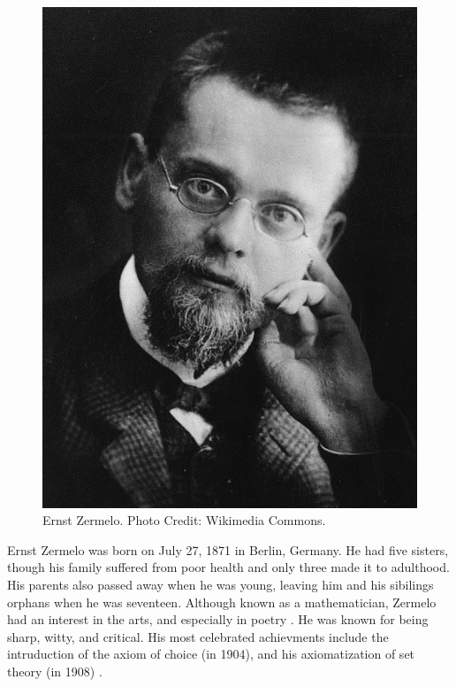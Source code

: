 \documentclass[../../../include/open-logic-section]{subfiles}
\begin{document}


\begin{figure}[h!] 
\centering
\includegraphics[scale=1]{ernst-zermelo.jpg} 
\caption{Ernst Zermelo. Photo Credit: Wikimedia Commons.} 
\end{figure}

Ernst Zermelo was born on July 27, 1871 in Berlin, Germany. He had five
sisters, though his family suffered from poor health and only three made it
to adulthood. His parents also passed away when he was young, leaving him
and his sibilings orphans when he was seventeen. Although known as a
mathematician, Zermelo had an interest in the arts, and especially in
poetry \citep[5]{Ebbinghaus2015}. He was known for being sharp, witty, and
critical. His most celebrated achievments include the intruduction of the
axiom of choice (in 1904), and his axiomatization of set theory (in 1908)
\citep[3]{Ebbinghaus2010}.
\end{document}
